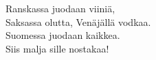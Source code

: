 
Ranskassa juodaan viiniä, \\ Saksassa olutta, Venäjällä vodkaa. \\ Suomessa juodaan kaikkea. \\ Siis malja sille nostakaa!